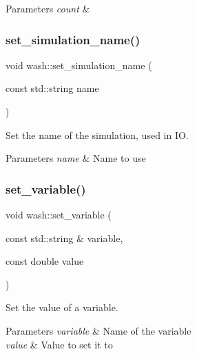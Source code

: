 \begin{DoxyParams}{Parameters}
{\em count} & \\
\hline
\end{DoxyParams}
\mbox{\label{namespacewash_a4ddbab848bef96e0fc69bf8e280d4775}} 
\subsubsection{\texorpdfstring{set\+\_\+simulation\+\_\+name()}{set\_simulation\_name()}}
{\footnotesize\ttfamily void wash\+::set\+\_\+simulation\+\_\+name (\begin{DoxyParamCaption}\item[{const std\+::string}]{name }\end{DoxyParamCaption})}



Set the name of the simulation, used in IO. 


\begin{DoxyParams}{Parameters}
{\em name} & Name to use \\
\hline
\end{DoxyParams}
\mbox{\label{namespacewash_a5045909b6d97db3d92cc44bfd5df70ee}} 
\subsubsection{\texorpdfstring{set\+\_\+variable()}{set\_variable()}}
{\footnotesize\ttfamily void wash\+::set\+\_\+variable (\begin{DoxyParamCaption}\item[{const std\+::string \&}]{variable,  }\item[{const double}]{value }\end{DoxyParamCaption})}



Set the value of a variable. 


\begin{DoxyParams}{Parameters}
{\em variable} & Name of the variable \\
\hline
{\em value} & Value to set it to \\
\hline
\end{DoxyParams}
\mbox{\label{namespacewash_a706d6d30508a81b6b9f25494cd759dff}} 
